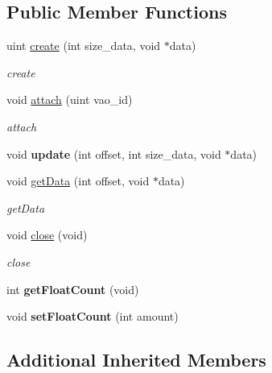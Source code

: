 \subsection*{Public Member Functions}
\begin{DoxyCompactItemize}
\item 
uint \hyperlink{classEngine_1_1GLVertexBuffer_a34314a2b1f249bec246508a39af02c66}{create} (int size\+\_\+data, void $\ast$data)
\begin{DoxyCompactList}\small\item\em create \end{DoxyCompactList}\item 
void \hyperlink{classEngine_1_1GLVertexBuffer_ae92c6c261902cbf1b7250ba559dec117}{attach} (uint vao\+\_\+id)
\begin{DoxyCompactList}\small\item\em attach \end{DoxyCompactList}\item 
\hypertarget{classEngine_1_1GLVertexBuffer_acdc9deee4ae75b09b84912303eb1a957}{}void {\bfseries update} (int offset, int size\+\_\+data, void $\ast$data)\label{classEngine_1_1GLVertexBuffer_acdc9deee4ae75b09b84912303eb1a957}

\item 
void \hyperlink{classEngine_1_1GLVertexBuffer_ad62200d5611e256f2f1df87d13bc9651}{get\+Data} (int offset, void $\ast$data)
\begin{DoxyCompactList}\small\item\em get\+Data \end{DoxyCompactList}\item 
void \hyperlink{classEngine_1_1GLVertexBuffer_a30af4a237541ae40c69983ceebf7363a}{close} (void)
\begin{DoxyCompactList}\small\item\em close \end{DoxyCompactList}\item 
\hypertarget{classEngine_1_1GLVertexBuffer_af1c126b18083ff76eaf0e9685ab45512}{}int {\bfseries get\+Float\+Count} (void)\label{classEngine_1_1GLVertexBuffer_af1c126b18083ff76eaf0e9685ab45512}

\item 
\hypertarget{classEngine_1_1GLVertexBuffer_a3592487858ab9b5c3b689af3765347fe}{}void {\bfseries set\+Float\+Count} (int amount)\label{classEngine_1_1GLVertexBuffer_a3592487858ab9b5c3b689af3765347fe}

\end{DoxyCompactItemize}
\subsection*{Additional Inherited Members}



